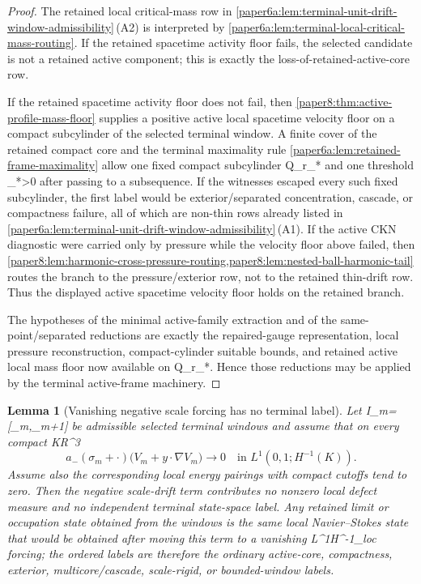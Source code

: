 \documentclass[11pt]{amsart}
\def\({}%
\def\){}%
\def\mathbb#1{#1}%
\theoremstyle{plain}
\newtheorem{lemma}[lemma]{Lemma}
\theoremstyle{definition}
\theoremstyle{remark}
\begin{document}
\begin{proof}
The retained local critical-mass row in
\cref{paper6a:lem:terminal-unit-drift-window-admissibility}\,\textup{(A2)} is
interpreted by \cref{paper6a:lem:terminal-local-critical-mass-routing}.  If the
retained spacetime activity floor fails, the selected candidate is not a retained active
component; this is exactly the loss-of-retained-active-core row.
\par
If the retained spacetime activity floor does not fail, then
\cref{paper8:thm:active-profile-mass-floor} supplies a positive active local
spacetime velocity floor on a compact subcylinder of the selected terminal window.  A
finite cover of the retained compact core and the terminal maximality rule
\cref{paper6a:lem:retained-frame-maximality} allow one fixed compact
subcylinder \(Q_{r_*}\) and one threshold \(\eta_*>0\) after passing to a
subsequence.  If the witnesses escaped every such fixed subcylinder, the first
label would be exterior/separated concentration, cascade, or compactness
failure, all of which are non-thin rows already listed in
\cref{paper6a:lem:terminal-unit-drift-window-admissibility}\,\textup{(A1)}.
If the active CKN diagnostic were carried only by pressure while the velocity
floor above failed, then
\cref{paper8:lem:harmonic-cross-pressure-routing,paper8:lem:nested-ball-harmonic-tail}
routes the branch to the pressure/exterior row, not to the retained thin-drift
row.  Thus the displayed active spacetime velocity floor holds on the retained
branch.
\par
The hypotheses of the minimal active-family extraction and of the
same-point/separated reductions are exactly the repaired-gauge representation,
local pressure reconstruction, compact-cylinder suitable bounds, and retained
active local mass floor now available on \(Q_{r_*}\).  Hence those reductions
may be applied by the terminal active-frame machinery.
\end{proof}

\begin{lemma}[Vanishing negative scale forcing has no terminal label]
\label{paper6a:lem:vanishing-negative-drift-forcing-absorbed}
Let \(I_m=[\sigma_m,\sigma_m+1]\) be admissible selected terminal windows and
assume that on every compact \(K\Subset\mathbb R^3\)
\[
  a_-(\sigma_m+\cdot)
  \bigl(V_m+y\cdot\nabla V_m\bigr)
  \longrightarrow0
  \quad\text{in }L^1(0,1;H^{-1}(K)).
\]
Assume also the corresponding local energy pairings with compact cutoffs tend
to zero.  Then the negative scale-drift term contributes no nonzero local
defect measure and no independent terminal state-space label.  Any retained
limit or occupation state obtained from the windows is the same local
Navier--Stokes state that would be obtained after moving this term to a
vanishing \(L^1H^{-1}_{\rm loc}\) forcing; the ordered labels are therefore the
ordinary active-core, compactness, exterior, multicore/cascade, scale-rigid,
or bounded-window labels.
\end{lemma}
\end{document}
